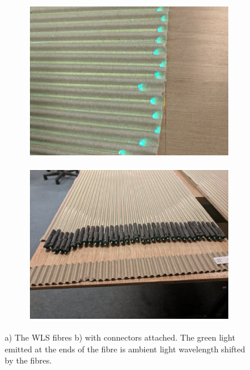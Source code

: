 \begin{figure}[!h]
\centering
\begin{subfigure}{.5\textwidth}
  \centering
  \includegraphics[width=\linewidth]{Chapter3/Figs/Raster/detCon013b_WlsFibres.png}
  \captionsetup{width=.9\linewidth}
  \caption{}
  \label{subFig:detCon013b_WlsFibres}
\end{subfigure}%
\begin{subfigure}{.5\textwidth}
  \centering
  \includegraphics[width=\linewidth]{Chapter3/Figs/Raster/detCon014b_WlsWithEnds.png}
  \captionsetup{width=.9\linewidth}
  \caption{}
  \label{subFig:detCon014b_WlsWithEnds}
\end{subfigure}
\caption{a) The WLS fibres b) with connectors attached. The green light emitted at the ends of the fibre is ambient light wavelength shifted by the fibres.} %
\label{fig:detCon_WlsFibres_WlsWithEnds}
\end{figure}


